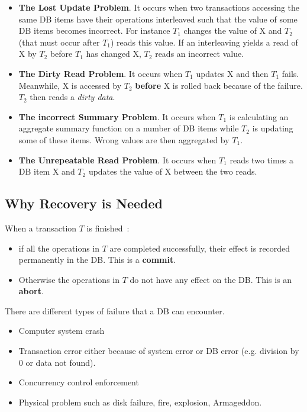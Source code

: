 \begin{itemize}
    \item \textbf{The Lost Update Problem}. It occurs when two transactions accessing the same DB items have their operations interleaved such that the value of some DB items becomes incorrect. For instance $T_1$ changes the value of X and $T_2$ (that must occur after $T_1$) reads this value. If an interleaving yields a read of X by $T_2$ before $T_1$ has changed X, $T_2$ reads an incorrect value.
    
    \item \textbf{The Dirty Read Problem}. It occurs when $T_1$ updates X and then $T_1$ fails. Meanwhile, X is accessed by $T_2$ \textbf{before} X is rolled back because of the failure. $T_2$ then reads a \textit{dirty data}.
    
    \item \textbf{The incorrect Summary Problem}. It occurs when $T_1$ is calculating an aggregate summary function on a number of DB items while $T_2$ is updating some of these items. Wrong values are then aggregated by $T_1$.
    
    \item \textbf{The Unrepeatable Read Problem}. It occurs when $T_1$ reads two times a DB item X and $T_2$ updates the value of X between the two reads. 
\end{itemize}

\subsection{Why Recovery is Needed}
When a transaction $T$ is finished~:
\begin{itemize}
    \item if all the operations in $T$ are completed successfully, their effect is recorded permanently in the DB. This is a \textbf{commit}.
    \item Otherwise the operations in $T$ do not have any effect on the DB. This is an \textbf{abort}.
\end{itemize}

There are different types of failure that a DB can encounter.

\begin{itemize}
    \item Computer system crash
    \item Transaction error either because of system error or DB error (e.g. division by 0 or data not found).
    \item Concurrency control enforcement
    \item Physical problem such as disk failure, fire, explosion, Armageddon.
\end{itemize}

